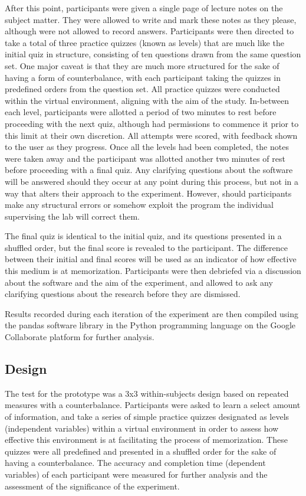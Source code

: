 \documentclass{vgtc}                          %
\begin{document}
After this point, participants were given a single page of lecture notes on the subject matter. They were allowed to write and mark these notes as they please, although were not allowed to record answers. Participants were then directed to take a total of three practice quizzes (known as levels) that are much like the initial quiz in structure, consisting of ten questions drawn from the same question set. One major caveat is that they are much more structured for the sake of having a form of counterbalance, with each participant taking the quizzes in predefined orders from the question set. All practice quizzes were conducted within the virtual environment, aligning with the aim of the study. In-between each level, participants were allotted a period of two minutes to rest before proceeding with the next quiz, although had permissions to commence it prior to this limit at their own discretion. All attempts were scored, with feedback shown to the user as they progress. Once all the levels had been completed, the notes were taken away and the participant was allotted another two minutes of rest before proceeding with a final quiz. Any clarifying questions about the software will be answered should they occur at any point during this process, but not in a way that alters their approach to the experiment. However, should participants make any structural errors or somehow exploit the program the individual supervising the lab will correct them.

The final quiz is identical to the initial quiz, and its questions presented in a shuffled order, but the final score is revealed to the participant. The difference between their initial and final scores will be used as an indicator of how effective this medium is at memorization. Participants were then debriefed via a discussion about the software and the aim of the experiment, and allowed to ask any clarifying questions about the research before they are dismissed.

Results recorded during each iteration of the experiment are then compiled using the pandas software library in the Python programming language on the Google Collaborate platform for further analysis.

\subsection{Design}

The test for the prototype was a 3x3 within-subjects design based on repeated measures with a counterbalance. Participants were asked to learn a select amount of information, and take a series of simple practice quizzes designated as levels (independent variables) within a virtual environment in order to assess how effective this environment is at facilitating the process of memorization. These quizzes were all predefined and presented in a shuffled order for the sake of having a counterbalance. The accuracy and completion time (dependent variables) of each participant were measured for further analysis and the assessment of the significance of the experiment.
\end{document}
